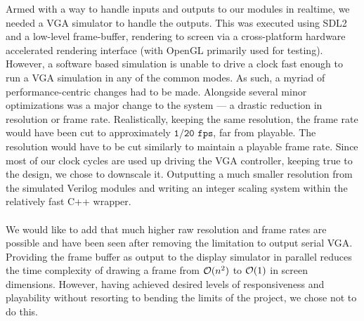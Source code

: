 Armed with a way to handle inputs and outputs to our modules in realtime, we 
needed a VGA simulator to handle the outputs. This was executed using
SDL2 and a low-level frame-buffer, rendering to screen via 
a cross-platform hardware accelerated rendering interface (with OpenGL \cite{opengl}
primarily used for testing).\\

However, a software based simulation is unable to drive a clock fast enough
to run a VGA simulation in any of the common modes. As such,
a myriad of performance-centric changes had to be made. Alongside several
minor optimizations was a major change to the system --- a drastic reduction in
resolution or frame rate. Realistically, keeping the same resolution, the frame 
rate would have been cut to approximately \(\texttt{1/20 fps}\), far from playable.
The resolution would have to be cut similarly to maintain a playable frame rate.
Since most of our clock cycles are used up driving the VGA controller, keeping true
to the design, we chose to downscale it. Outputting a much smaller resolution from
the simulated Verilog modules and writing an integer scaling \cite{intscale} system
within the relatively fast C++ wrapper. 
\\ \\
We would like to add that much higher raw resolution and frame rates are possible 
and have been seen after removing the limitation to output serial VGA. Providing
the frame buffer as output to the display simulator in parallel reduces the time
complexity of drawing a frame from \(\mathcal{O} (n^2)\) to \(\mathcal{O} (1)\) in screen 
dimensions. However, having achieved desired levels of responsiveness and 
playability without resorting to bending the limits of the project, we chose not 
to do this.